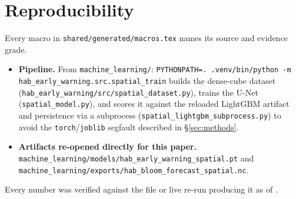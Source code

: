 \documentclass[runningheads]{llncs}
\begin{document}
\section*{Reproducibility}
Every macro in \texttt{shared/generated/macros.tex} names its source and
evidence grade.
{\raggedright\sloppy
\begin{itemize}\itemsep1pt\parskip0pt
\item[] \textbf{Pipeline.} From \texttt{machine\_learning/}:
\texttt{PYTHONPATH=. .venv/bin/python\allowbreak{} -m\allowbreak{}
hab\_early\_warning.src.spatial\_train} builds the dense-cube dataset
(\texttt{hab\_early\_warning/src/\allowbreak{}spatial\_dataset.py}), trains
the U-Net (\texttt{spatial\_model.py}), and scores it against the reloaded
LightGBM artifact and persistence via a subprocess
(\texttt{spatial\_lightgbm\_subprocess.py}) to avoid the
\texttt{torch}/\texttt{joblib} segfault described in \S\ref{sec:methods}.
\item[] \textbf{Artifacts re-opened directly for this paper.}
\texttt{machine\_learning/models/\allowbreak{}hab\_early\_warning\_spatial.pt}
and
\texttt{machine\_learning/exports/\allowbreak{}hab\_bloom\_forecast\_spatial.nc}.
\end{itemize}}
Every number was verified against the file or live re-run producing it as
of \AsOf{}.



\end{document}
